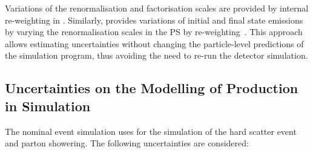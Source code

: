 Variations of the renormalisation and factorisation scales are provided by
internal re-weighting in \POWHEGBOX[v2]. Similarly, \PYTHIA[8] provides
variations of initial and final state emissions by varying the renormalisation
scales in the PS by re-weighting~\cite{Mrenna:2016sih,pythia-variations-online}.
This approach allows estimating uncertainties without changing the
particle-level predictions of the simulation program, thus avoiding the need to
re-run the detector simulation.


\subsection{Uncertainties on the Modelling of \Zjets Production in Simulation}%
\label{app:zjets_uncertainties}

The nominal \Zjets event simulation uses \SHERPA[2.2.1] for the simulation of
the hard scatter event and parton showering. The following uncertainties are
considered:
